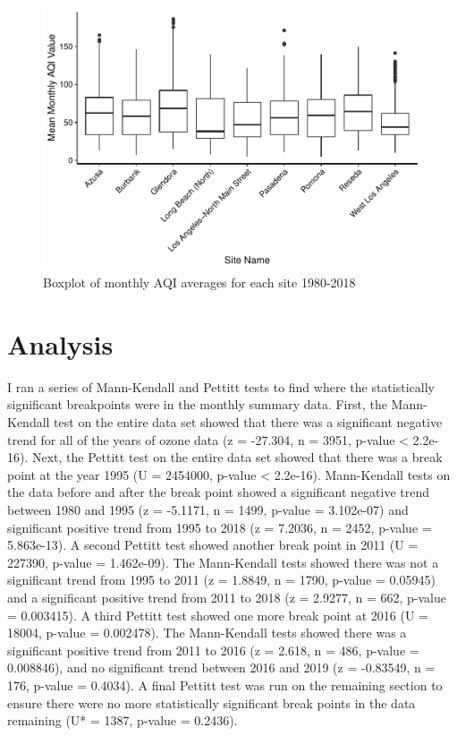 \documentclass[12pt,]{article}
\begin{document}
\begin{figure}
\centering
\includegraphics{Roth_ENV872_Project_files/figure-latex/exploratory graph3-1.pdf}
\caption{Boxplot of monthly AQI averages for each site 1980-2018}
\end{figure}

\newpage

\section{Analysis}\label{analysis}

I ran a series of Mann-Kendall and Pettitt tests to find where the
statistically significant breakpoints were in the monthly summary data.
First, the Mann-Kendall test on the entire data set showed that there
was a significant negative trend for all of the years of ozone data (z =
-27.304, n = 3951, p-value \textless{} 2.2e-16). Next, the Pettitt test
on the entire data set showed that there was a break point at the year
1995 (U = 2454000, p-value \textless{} 2.2e-16). Mann-Kendall tests on
the data before and after the break point showed a significant negative
trend between 1980 and 1995 (z = -5.1171, n = 1499, p-value = 3.102e-07)
and significant positive trend from 1995 to 2018 (z = 7.2036, n = 2452,
p-value = 5.863e-13). A second Pettitt test showed another break point
in 2011 (U = 227390, p-value = 1.462e-09). The Mann-Kendall tests showed
there was not a significant trend from 1995 to 2011 (z = 1.8849, n =
1790, p-value = 0.05945) and a significant positive trend from 2011 to
2018 (z = 2.9277, n = 662, p-value = 0.003415). A third Pettitt test
showed one more break point at 2016 (U = 18004, p-value = 0.002478). The
Mann-Kendall tests showed there was a significant positive trend from
2011 to 2016 (z = 2.618, n = 486, p-value = 0.008846), and no
significant trend between 2016 and 2019 (z = -0.83549, n = 176, p-value
= 0.4034). A final Pettitt test was run on the remaining section to
ensure there were no more statistically significant break points in the
data remaining (U* = 1387, p-value = 0.2436).
\end{document}

